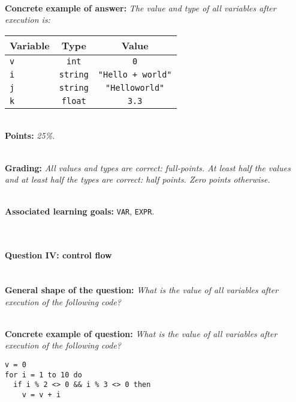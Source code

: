 \documentclass[12pt,a4paper,final]{article}
\begin{document}
\ \\ 

\textbf{Concrete example of answer:} \textit{The value and type of all variables after execution is:}

\begin{tabular}{| l | c | c | }
\hline
\textbf{Variable} & \textbf{Type} & \textbf{Value} \\
\hline
\texttt{v} & \texttt{int} & \texttt{0} \\
\hline
\texttt{i} & \texttt{string} & \texttt{"Hello + world"} \\
\hline
\texttt{j} & \texttt{string} & \texttt{"Helloworld"} \\
\hline
\texttt{k} & \texttt{float} & \texttt{3.3} \\
\hline
\end{tabular}

\ \\ 

\textbf{Points:} \textit{25\%.}

\ \\ 

\textbf{Grading:} \textit{All values and types are correct: full-points. At least half the values and at least half the types are correct: half points. Zero points otherwise.}

\ \\ 

\textbf{Associated learning goals:} \texttt{VAR}, \texttt{EXPR}.

\ \\ 

\paragraph{Question IV: control flow}

\ \\ 

\textbf{General shape of the question:} \textit{What is the value of all variables after execution of the following code?}

\ \\ 

\textbf{Concrete example of question:} \textit{What is the value of all variables after execution of the following code?}

\begin{lstlisting}
v = 0
for i = 1 to 10 do
  if i % 2 <> 0 && i % 3 <> 0 then
    v = v + i
\end{lstlisting}
\end{document}
